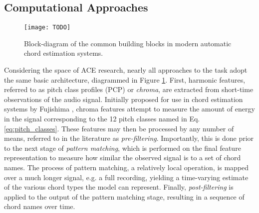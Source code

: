 \subsection{Computational Approaches}
\label{subsec:computational_approaches}

\begin{figure}[t]
\centering
\texttt{[image: TODO]}
\caption{Block-diagram of the common building blocks in modern automatic chord estimation systems.}
\label{fig:basic_ace}
\end{figure}

Considering the space of ACE research, nearly all approaches to the task adopt the same basic architecture, diagrammed in Figure \ref{fig:basic_ace}.
First, harmonic features, referred to as pitch class profiles (PCP) or \emph{chroma}, are extracted from short-time observations of the audio signal.
Initially proposed for use in chord estimation systems by Fujishima \cite{Fujishima1999Realtime}, chroma features attempt to measure the amount of energy in the signal corresponding to the 12 pitch classes named in Eq. \ref{eq:pitch_classes}.
These features may then be processed by any number of means, referred to in the literature as \emph{pre-filtering}.
Importantly, this is done prior to the next stage of \emph{pattern matching}, which is performed on the final feature representation to measure how similar the observed signal is to a set of chord names.
The process of pattern matching, a relatively local operation, is mapped over a much longer signal, e.g. a full recording, yielding a time-varying estimate of the various chord types the model can represent.
Finally, \emph{post-filtering} is applied to the output of the pattern matching stage, resulting in a sequence of chord names over time.

